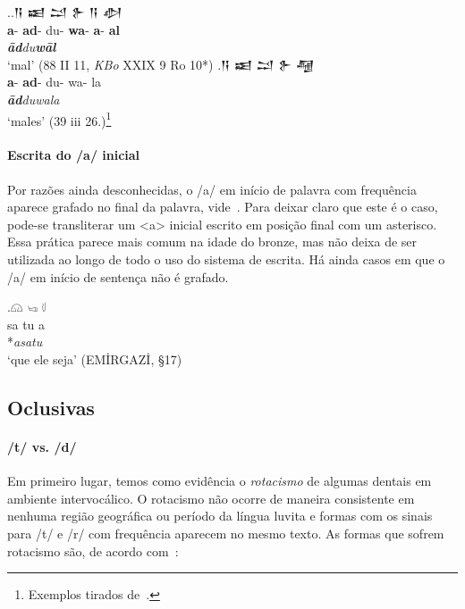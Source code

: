 \ex.\ag.\foreignlanguage{hittite}{𒀀} \foreignlanguage{hittite}{𒀜}
\foreignlanguage{hittite}{𒁺}  \foreignlanguage{hittite}{𒉿}
\foreignlanguage{hittite}{𒀀}  \foreignlanguage{hittite}{𒀠}\\
\textbf{a}- \textbf{ad}- du- \textbf{wa}- \textbf{a}- \textbf{al}\\
\emph{\textbf{ād}du\textbf{wāl}}\\
`mal' (88 II 11, \emph{KBo} XXIX 9 Ro 10*)
\bg.\foreignlanguage{hittite}{𒀀} \foreignlanguage{hittite}{𒀜}
\foreignlanguage{hittite}{𒁺}  \foreignlanguage{hittite}{𒉿}
\foreignlanguage{hittite}{𒆷}\\
\textbf{a}- \textbf{ad}- du- wa- la\\
\emph{\textbf{ād}duwala}\\
`males' (39 iii 26.)\footnote{Exemplos tirados de~\citet{Melchert1993}.}

\paragraph{Escrita do /a/ inicial} Por razões ainda desconhecidas, o /a/ em
início de palavra com frequência aparece grafado no final da palavra,
vide~\Next. Para deixar claro que este é o caso, pode-se transliterar um <a>
inicial escrito em posição final com um asterisco.
Essa prática parece mais comum na idade do bronze, mas não deixa de ser
utilizada ao longo de todo o uso do sistema de escrita.
Há ainda casos em que o /a/ em início de sentença não é grafado.

\exg.\Large 𔗔 \Large  𔑢 \Large 𔗷\\
sa tu a\\
*\emph{asatu}\\
`que ele seja' (EMİRGAZİ, §17)



\subsection{Oclusivas}

\paragraph{/t/ vs. /d/}
Em primeiro lugar, temos como evidência o \emph{rotacismo} de algumas dentais em
ambiente intervocálico.
O rotacismo não ocorre de maneira consistente em nenhuma região geográfica ou
período da língua luvita e formas com os sinais para /t/ e /r/ com frequência
aparecem no mesmo texto.
As formas que sofrem rotacismo são, de acordo
com~\citet[249--50]{MorpurgoDavies1982}:

